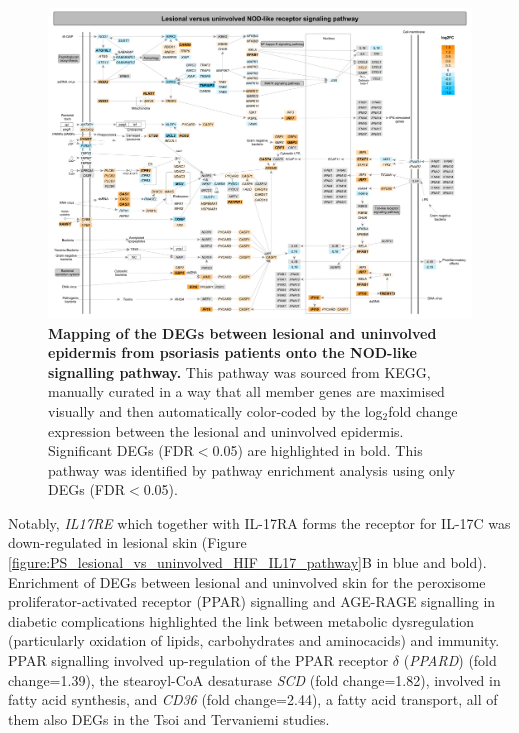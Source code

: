 \begin{landscape}
\begin{figure}[htbp]
\centering
\includegraphics[width=\textwidth]{./Results2/pdfs/PS_lesional_uninvolved_all_NOD_like_pathway}
\caption[Mapping of the DEGs between lesional and uninvolved epidermis from psoriasis patients onto the NOD-like signalling pathway.]{\textbf{Mapping of the DEGs between lesional and uninvolved epidermis from psoriasis patients onto the NOD-like signalling pathway.} This pathway was sourced from KEGG, manually curated in a way that all member genes are maximised visually and then automatically color-coded by the log$_2$fold change expression between the lesional and uninvolved epidermis. Significant DEGs (FDR$<$0.05) are highlighted in bold. This pathway was identified by pathway enrichment analysis using only DEGs (FDR$<$0.05).}
\label{figure:PS_lesional_vs_uninvolved_NOD_pathway}
\end{figure}
\end{landscape}


\noindent Notably, \textit{IL17RE} which together with IL-17RA forms the receptor for IL-17C was down-regulated in lesional skin (Figure \ref{figure:PS_lesional_vs_uninvolved_HIF_IL17_pathway}B in blue and bold). Enrichment of DEGs between lesional and uninvolved skin for the peroxisome proliferator-activated receptor (PPAR) signalling and AGE-RAGE signalling in diabetic complications highlighted the link between metabolic dysregulation (particularly oxidation of lipids, carbohydrates and aminocacids) and immunity. PPAR signalling involved up-regulation of the PPAR receptor $\delta$ (\textit{PPARD}) (fold change=1.39), the stearoyl-CoA desaturase \textit{SCD} (fold change=1.82), involved in fatty acid synthesis, and \textit{CD36} (fold change=2.44), a fatty acid transport, all of them also DEGs in the Tsoi and Tervaniemi studies.

